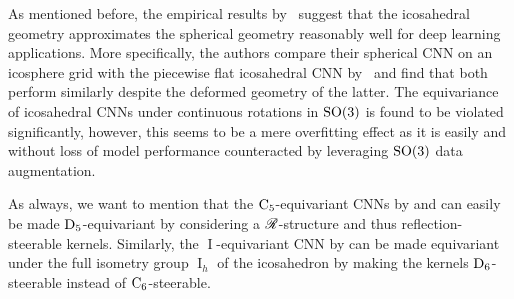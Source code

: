As mentioned before, the empirical results by~\citet{kicanaoglu2019gaugeSphere} suggest that the icosahedral geometry approximates the spherical geometry reasonably well for deep learning applications.
More specifically, the authors compare their spherical CNN on an icosphere grid with the piecewise flat icosahedral CNN by~\citet{gaugeIco2019} and find that both perform similarly despite the deformed geometry of the latter.
The equivariance of icosahedral CNNs under continuous rotations in $\operatorname{SO}(3)$ is found to be violated significantly, however, this seems to be a mere overfitting effect as it is easily and without loss of model performance counteracted by leveraging $\operatorname{SO}(3)$ data augmentation.


As always, we want to mention that the $\operatorname{C}_{5}$-equivariant CNNs by \citet{liu2018icoAltAz} and \citet{zhang2019orientation} can easily be made $\operatorname{D}_{5}$-equivariant by considering a $\mathscr{R}$-structure and thus reflection-steerable kernels.
Similarly, the $\operatorname{I}$-equivariant CNN by \citet{gaugeIco2019} can be made equivariant under the full isometry group $\operatorname{I}_h$ of the icosahedron by making the kernels $\operatorname{D}_{6}$-steerable instead of $\operatorname{C}_{6}$-steerable.
